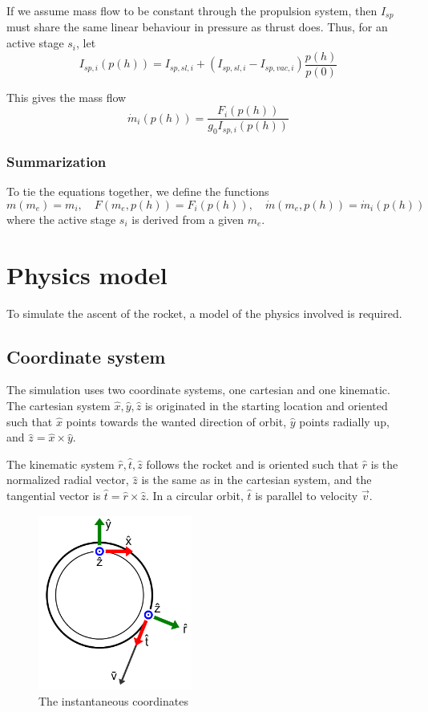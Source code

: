 \documentclass[11pt]{article}
\begin{document}
If we assume mass flow to be constant through the propulsion system, then $I_{sp}$ must share the same linear behaviour in pressure as thrust does.
Thus, for an active stage $s_i$, let
$$
I_{sp,i}(p(h)) = I_{sp,sl,i} + \left( I_{sp,sl,i} - I_{sp,vac,i} \right) \frac{p(h)}{p(0)}
$$

This gives the mass flow
$$
\dot{m}_i(p(h)) = \frac{F_i(p(h))}{ g_0 I_{sp,i}(p(h))}
$$

\subsubsection{Summarization}
To tie the equations together, we define the functions
$$
m(m_e) = m_i, \quad 
F(m_e, p(h)) = F_i(p(h)), \quad 
\dot{m}(m_e, p(h)) = \dot{m}_i(p(h)) \quad 
$$
where the active stage $s_i$ is derived from a given $m_e$.

\section{Physics model}
To simulate the ascent of the rocket, a model of the physics involved is required.

\subsection{Coordinate system}
The simulation uses two coordinate systems, one cartesian and one kinematic.
The cartesian system $\hat{x}, \hat{y}, \hat{z}$ is originated in the starting location and oriented such that
$\hat{x}$ points towards the wanted direction of orbit,
$\hat{y}$ points radially up, and $\hat{z} = \hat{x} \times \hat{y}$.

The kinematic system $\hat{r}, \hat{t}, \hat{z}$ follows the rocket and is oriented such that 
$\hat{r}$ is the normalized radial vector, $\hat{z}$ is the same as in the cartesian system, 
and the tangential vector is $\hat{t} = \hat{r} \times \hat{z}$. In a circular orbit, $\hat{t}$ is parallel to velocity $\vec{v}$.

\begin{figure}[H]
  \centering
  \includegraphics[width=0.45\textwidth]{./orbit.png}
  \caption{The instantaneous coordinates}
\end{figure}
\end{document}
